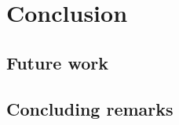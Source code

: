 \chapter{Conclusion}  \label{chapter:conclusion}


\section{Future work}

\section{Concluding remarks}
